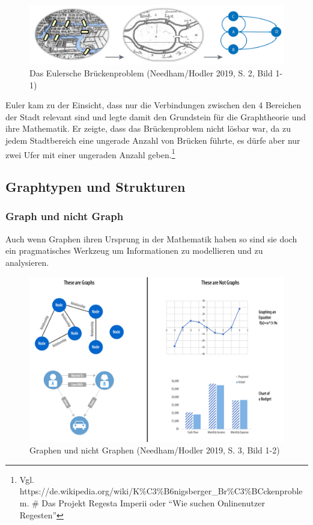 \begin{figure}
\centering
\includegraphics{Bilder/Eulersche-Bruecken.png}
\caption{Das Eulersche Brückenproblem (Needham/Hodler 2019, S. 2, Bild
1-1)}
\end{figure}

Euler kam zu der Einsicht, dass nur die Verbindungen zwischen den 4
Bereichen der Stadt relevant sind und legte damit den Grundstein für die
Graphtheorie und ihre Mathematik. Er zeigte, dass das Brückenproblem
nicht lösbar war, da zu jedem Stadtbereich eine ungerade Anzahl von
Brücken führte, es dürfe aber nur zwei Ufer mit einer ungeraden Anzahl
geben.\footnote{Vgl.
  https://de.wikipedia.org/wiki/K\%C3\%B6nigsberger\_Br\%C3\%BCckenproblem.
  \# Das Projekt Regesta Imperii oder ``Wie suchen Onlinenutzer
  Regesten''}

\hypertarget{graphtypen-und-strukturen}{%
\subsection{Graphtypen und Strukturen}\label{graphtypen-und-strukturen}}

\hypertarget{graph-und-nicht-graph}{%
\subsubsection{Graph und nicht Graph}\label{graph-und-nicht-graph}}

Auch wenn Graphen ihren Ursprung in der Mathematik haben so sind sie
doch ein pragmatisches Werkzeug um Informationen zu modellieren und zu
analysieren.

\begin{figure}
\centering
\includegraphics{Bilder/Graph-Algorithms/02-1-2-GraphsNotGraphs.png}
\caption{Graphen und nicht Graphen (Needham/Hodler 2019, S. 3, Bild
1-2)}
\end{figure}

